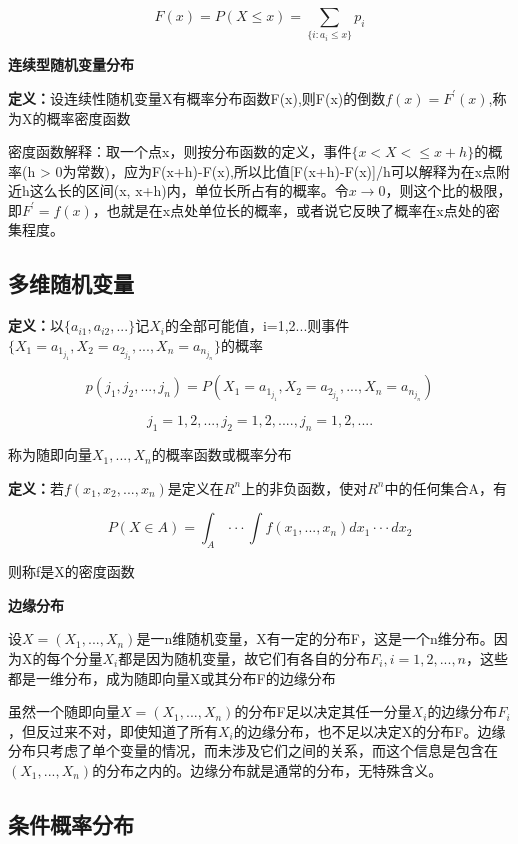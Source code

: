 \documentclass{ctexart}
\begin{document}
	\[F(x)=P(X \leq x)=\sum_{\{i:a_i \leq x\}}p_i\]
	
	\textbf{连续型随机变量分布}
	
	\textbf{定义：}设连续性随机变量X有概率分布函数F(x),则F(x)的倒数\(f(x)=F^{'} (x)\),称为X的概率密度函数
	
	密度函数解释：取一个点x，则按分布函数的定义，事件\(\{x < X < \leq x+h\}\)的概率(h > 0为常数)，应为F(x+h)-F(x),所以比值[F(x+h)-F(x)]/h可以解释为在x点附近h这么长的区间(x, x+h)内，单位长所占有的概率。令\(x \to 0\)，则这个比的极限，即\(F^{'}=f(x)\)，也就是在x点处单位长的概率，或者说它反映了概率在x点处的密集程度。
	
	\subsection{多维随机变量}
	
	\textbf{定义：}以\(\{a_{i1},a_{i2},...\}\)记\(X_i\)的全部可能值，i=1,2...则事件\(\{X_1=a_{1_{j_1}}, X_2=a_{2_{j_2}},...,X_n=a_{n_{j_n}}\}\)的概率
	
	\[p(j_1,j_2,...,j_n)=P(X_1=a_{1_{j_1}}, X_2=a_{2_{j_2}},...,X_n=a_{n_{j_n}})\]
	
	\[j_1=1,2,..., j_2=1,2,...., j_n=1,2,....\]
	
	称为随即向量\(X_1,...,X_n\)的概率函数或概率分布
	
	\textbf{定义：}若\(f(x_1,x_2,...,x_n)\)是定义在\(R^n\)上的非负函数，使对\(R^n\)中的任何集合A，有
	
	\[P(X \in A) = \int_A···\int f(x_1,...,x_n)dx_1···dx_2\]
	
	则称f是X的密度函数
	
	\mbox{}
	
	\textbf{边缘分布}
	
	设\(X=(X_1,...,X_n)\)是一n维随机变量，X有一定的分布F，这是一个n维分布。因为X的每个分量\(X_i\)都是因为随机变量，故它们有各自的分布\(F_i,i=1,2,...,n\)，这些都是一维分布，成为随即向量X或其分布F的边缘分布
	
	虽然一个随即向量\(X=(X_1,...,X_n)\)的分布F足以决定其任一分量\(X_i\)的边缘分布\(F_i\)，但反过来不对，即使知道了所有\(X_i\)的边缘分布，也不足以决定X的分布F。边缘分布只考虑了单个变量的情况，而未涉及它们之间的关系，而这个信息是包含在\((X_1,...,X_n)\)的分布之内的。边缘分布就是通常的分布，无特殊含义。
	
	\subsection{条件概率分布}
	
\end{document}
